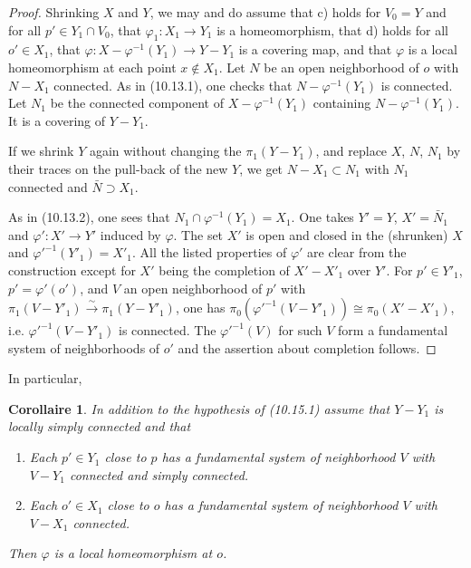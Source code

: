 \documentclass[12pt,a4paper]{article}
\theoremstyle{plain}
\newtheorem{corollary}[theorem]{Corollaire}
\theoremstyle{definition}
\theoremstyle{remark}
\begin{document}
\begin{proof}
Shrinking $X$ and $Y$, we may and do assume that c) holds for $V_0 = Y$ and for all $p' \in Y_1 \cap V_0$, that $\varphi_1 : X_1 \to Y_1$ is a homeomorphism, that d) holds for all $o' \in X_1$, that $\varphi : X - \varphi^{-1}(Y_1) \to Y - Y_1$ is a covering map, and that $\varphi$ is a local homeomorphism at each point $x \notin X_1$. Let $N$ be an open neighborhood of $o$ with $N - X_1$ connected. As in (10.13.1), one checks that $N - \varphi^{-1}(Y_1)$ is connected. Let $N_1$ be the connected component of $X - \varphi^{-1}(Y_1)$ containing $N - \varphi^{-1}(Y_1)$. It is a covering of $Y - Y_1$.

If we shrink $Y$ again without changing the $\pi_1(Y - Y_1)$, and replace $X$, $N$, $N_1$ by their traces on the pull-back of the new $Y$, we get $N - X_1 \subset N_1$ with $N_1$ connected and $\bar{N} \supset X_1$.

As in (10.13.2), one sees that $N_1 \cap \varphi^{-1}(Y_1) = X_1$. One takes $Y' = Y$, $X' = \bar{N}_1$ and $\varphi' : X' \to Y'$ induced by $\varphi$. The set $X'$ is open and closed in the (shrunken) $X$ and $\varphi'^{-1}(Y'_1) = X'_1$. All the listed properties of $\varphi'$ are clear from the construction except for $X'$ being the completion of $X' - X'_1$ over $Y'$. For $p' \in Y'_1$, $p' = \varphi'(o')$, and $V$ an open neighborhood of $p'$ with $\pi_1(V - Y'_1) \xrightarrow{\sim} \pi_1(Y - Y'_1)$, one has $\pi_0(\varphi'^{-1}(V - Y'_1)) \cong \pi_0(X' - X'_1)$, i.e. $\varphi'^{-1}(V - Y'_1)$ is connected. The $\varphi'^{-1}(V)$ for such $V$ form a fundamental system of neighborhoods of $o'$ and the assertion about completion follows.
\end{proof}

In particular,

\begin{corollary}
\label{10.15.4}
In addition to the hypothesis of (10.15.1) assume that $Y - Y_1$ is locally simply connected and that
\begin{enumerate}
\item[c')] Each $p' \in Y_1$ close to $p$ has a fundamental system of neighborhood $V$ with $V - Y_1$ connected and simply connected.
\item[d)] Each $o' \in X_1$ close to $o$ has a fundamental system of neighborhood $V$ with $V - X_1$ connected.
\end{enumerate}
Then $\varphi$ is a local homeomorphism at $o$.
\end{corollary}
\end{document}
